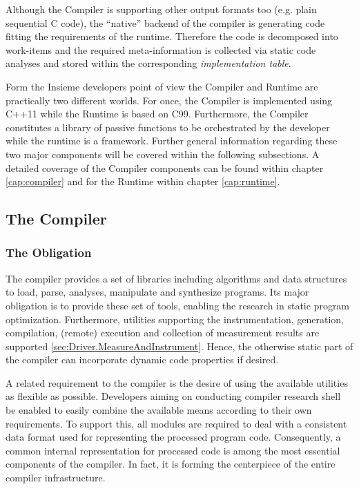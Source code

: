 Although the Compiler is supporting other output formats too (e.g. plain
sequential C code), the ``native'' backend of the compiler is generating code
fitting the requirements of the runtime. Therefore the code is decomposed
into work-items and the required meta-information is collected via static code
analyses and stored within the corresponding \textit{implementation table}.

Form the Insieme developers point of view the Compiler and Runtime are
practically two different worlds. For once, the Compiler is implemented using
C++11 while the Runtime is based on C99. Furthermore, the Compiler constitutes a
library of passive functions to be orchestrated by the developer while the
runtime is a framework. Further general information regarding these two major
components will be covered within the following subsections. A detailed
coverage of the Compiler components can be found within chapter
\ref{cap:compiler} and for the Runtime within chapter \ref{cap:runtime}.


\subsection{The Compiler}

\subsubsection{The Obligation}
The compiler provides a set of libraries including algorithms and data
structures to load, parse, analyses, manipulate and synthesize programs. Its
major obligation is to provide these set of tools, enabling the research in
static program optimization. Furthermore, utilities supporting the
instrumentation, generation, compilation, (remote) execution and collection of
measurement results are supported \ref{sec:Driver.MeasureAndInstrument}. Hence,
the otherwise static part of the compiler can incorporate dynamic code
properties if desired.

A related requirement to the compiler is the desire of using the available
utilities as flexible as possible. Developers aiming on conducting compiler
research shell be enabled to easily combine the available means according to
their own requirements. To support this, all modules are required to deal with a
consistent data format used for representing the processed program code.
Consequently, a common internal representation for processed code is among the
most essential components of the compiler. In fact, it is forming the
centerpiece of the entire compiler infrastructure.

